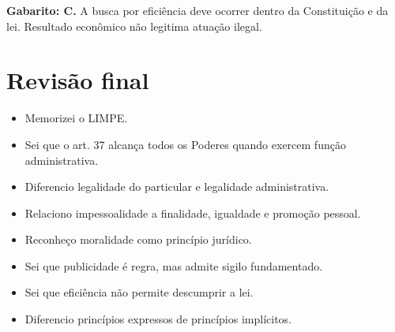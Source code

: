 \documentclass[11pt,a4paper]{article}
\begin{document}
\begin{alerta}
\textbf{Gabarito: C.} A busca por eficiência deve ocorrer dentro da Constituição e da lei. Resultado econômico não legitima atuação ilegal.
\end{alerta}

\section*{Revisão final}

\begin{itemize}
  \item[$\square$] Memorizei o LIMPE.
  \item[$\square$] Sei que o art. 37 alcança todos os Poderes quando exercem função administrativa.
  \item[$\square$] Diferencio legalidade do particular e legalidade administrativa.
  \item[$\square$] Relaciono impessoalidade a finalidade, igualdade e promoção pessoal.
  \item[$\square$] Reconheço moralidade como princípio jurídico.
  \item[$\square$] Sei que publicidade é regra, mas admite sigilo fundamentado.
  \item[$\square$] Sei que eficiência não permite descumprir a lei.
  \item[$\square$] Diferencio princípios expressos de princípios implícitos.
\end{itemize}
\end{document}
